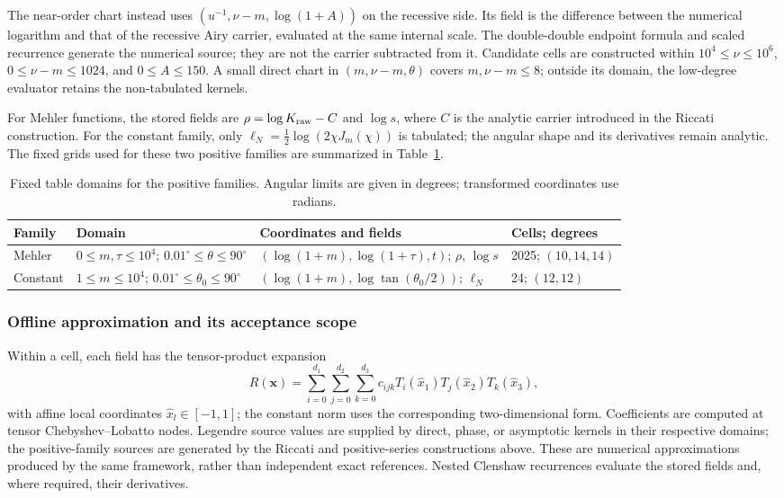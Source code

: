 ﻿\documentclass[11pt,a4paper]{article}
\begin{document}
The near-order chart instead uses $(u^{-1},\nu-m,\log(1+A))$ on the recessive side. Its field is the difference between the numerical logarithm and that of the recessive Airy carrier, evaluated at the same internal scale. The double-double endpoint formula and scaled recurrence generate the numerical source; they are not the carrier subtracted from it. Candidate cells are constructed within $10^4\leq\nu\leq10^6$, $0\leq\nu-m\leq1024$, and $0\leq A\leq150$. A small direct chart in $(m,\nu-m,\theta)$ covers $m,\nu-m\leq8$; outside its domain, the low-degree evaluator retains the non-tabulated kernels.

For Mehler functions, the stored fields are $\rho=\log K_{\rm raw}-C$ and $\log s$, where $C$ is the analytic carrier introduced in the Riccati construction. For the constant family, only $\ell_N=\tfrac12\log(2\chi J_m(\chi))$ is tabulated; the angular shape and its derivatives remain analytic. The fixed grids used for these two positive families are summarized in Table~\ref{tab:positive_atlas_parameters}.

\begin{table}[!htbp]
\centering
\caption{Fixed table domains for the positive families. Angular limits are given in degrees; transformed coordinates use radians.}
\label{tab:positive_atlas_parameters}
\footnotesize
\begin{tabular}{@{}p{}p{}p{}p{}@{}}
\toprule
Family & Domain & Coordinates and fields & Cells; degrees\\
\midrule
Mehler & $0\leq m,\tau\leq10^4$; $0.01^\circ\leq\theta\leq90^\circ$ & $(\log(1+m),\log(1+\tau),t)$; $\rho$, $\log s$ & 2025; $(10,14,14)$\\
Constant & $1\leq m\leq10^4$; $0.01^\circ\leq\theta_0\leq90^\circ$ & $(\log(1+m),\log\tan(\theta_0/2))$; $\ell_N$ & 24; $(12,12)$\\
\bottomrule
\end{tabular}
\end{table}

\subsubsection{Offline approximation and its acceptance scope}

Within a cell, each field has the tensor-product expansion
\begin{equation}
 R(\bm x)=\sum_{i=0}^{d_1}\sum_{j=0}^{d_2}\sum_{k=0}^{d_3}
 c_{ijk}T_i(\widehat x_1)T_j(\widehat x_2)T_k(\widehat x_3),
 \label{eq:atlas_tensor_chebyshev}
\end{equation}
with affine local coordinates $\widehat x_l\in[-1,1]$; the constant norm uses the corresponding two-dimensional form. Coefficients are computed at tensor Chebyshev--Lobatto nodes. Legendre source values are supplied by direct, phase, or asymptotic kernels in their respective domains; the positive-family sources are generated by the Riccati and positive-series constructions above. These are numerical approximations produced by the same framework, rather than independent exact references. Nested Clenshaw recurrences evaluate the stored fields and, where required, their derivatives.
\end{document}
